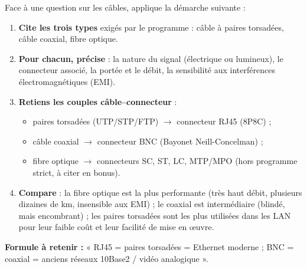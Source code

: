 \documentclass[11pt]{article}
\newcommand{\cle}[1]{{\popxbold\color{popdark}#1}}
\begin{document}
\begin{methode}
Face à une question sur les câbles, applique la démarche suivante :
\begin{enumerate}
  \item \textbf{Cite les trois types} exigés par le programme : câble à \cle{paires torsadées}, câble \cle{coaxial}, \cle{fibre optique}.
  \item \textbf{Pour chacun, précise} : la nature du signal (électrique ou lumineux), le connecteur associé, la portée et le débit, la sensibilité aux interférences électromagnétiques (EMI).
  \item \textbf{Retiens les couples câble--connecteur} :
  \begin{itemize}
    \item paires torsadées (UTP/STP/FTP) $\longrightarrow$ connecteur \cle{RJ45} (8P8C) ;
    \item câble coaxial $\longrightarrow$ connecteur \cle{BNC} (Bayonet Neill-Concelman) ;
    \item fibre optique $\longrightarrow$ connecteurs SC, ST, LC, MTP/MPO (hors programme strict, à citer en bonus).
  \end{itemize}
  \item \textbf{Compare} : la fibre optique est la plus performante (très haut débit, plusieurs dizaines de km, insensible aux EMI) ; le coaxial est intermédiaire (blindé, mais encombrant) ; les paires torsadées sont les plus utilisées dans les LAN pour leur faible coût et leur facilité de mise en œuvre.
\end{enumerate}
\textbf{Formule à retenir :} « RJ45 = paires torsadées = Ethernet moderne ; BNC = coaxial = anciens réseaux 10Base2 / vidéo analogique ».
\end{methode}
\end{document}
